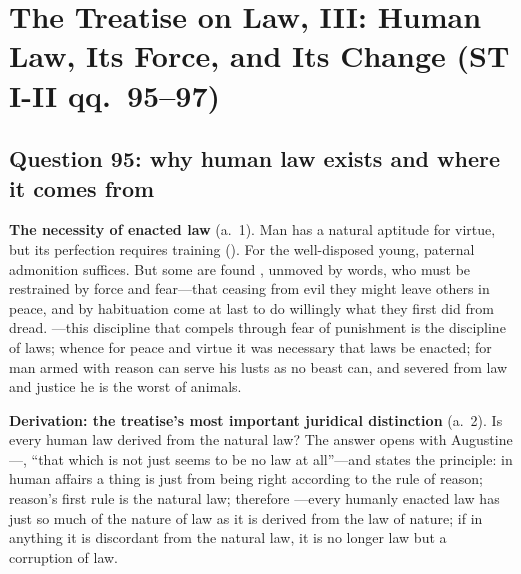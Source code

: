 \section{The Treatise on Law, III: Human Law, Its Force, and Its Change (ST I-II qq.~95--97)}

\subsection{Question 95: why human law exists and where it comes from}

\textbf{The necessity of enacted law} (a.~1). Man has a natural aptitude for virtue, but its perfection requires training (). For the well-disposed young, paternal admonition suffices. But some are found , unmoved by words, who must be restrained by force and fear---that ceasing from evil they might leave others in peace, and by habituation come at last to do willingly what they first did from dread. ---this discipline that compels through fear of punishment is the discipline of laws; whence for peace and virtue it was necessary that laws be enacted; for man armed with reason can serve his lusts as no beast can, and severed from law and justice he is the worst of animals.

\textbf{Derivation: the treatise's most important juridical distinction} (a.~2). Is every human law derived from the natural law? The answer opens with Augustine---, ``that which is not just seems to be no law at all''---and states the principle: in human affairs a thing is just from being right according to the rule of reason; reason's first rule is the natural law; therefore ---every humanly enacted law has just so much of the nature of law as it is derived from the law of nature; if in anything it is discordant from the natural law, it is no longer law but a corruption of law.

